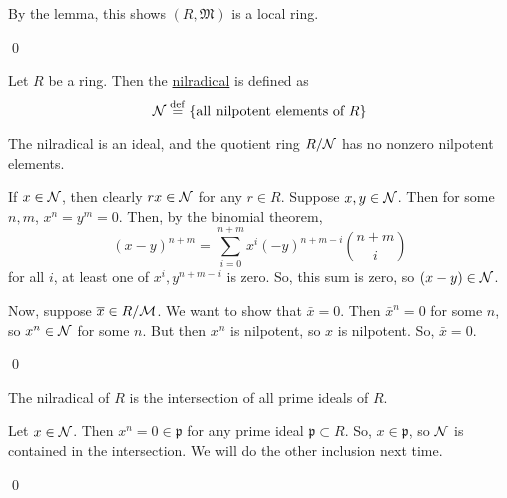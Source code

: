 \documentclass[x11names,reqno,14pt]{extarticle}
\newcommand{\mk}[1]{\mathfrak{#1}}
\begin{document}
By the lemma, this shows $(R, \mk{M})$ is a local ring. 

\qed


Let $R$ be a ring. Then the \underline{nilradical} is defined as
\[
\mathcal{N}\overset{\mathrm{def}}{=}\{\text{all nilpotent elements of }R\}
\]

\prop

The nilradical is an ideal, and the quotient ring $R/\mathcal{N}$ has no nonzero nilpotent elements. 

\proof

If $x \in \mathcal{N}$, then clearly $rx \in \mathcal{N}$ for any $r \in R$. Suppose $x, y \in \mathcal{N}$. Then for some $n, m$, $x^n = y^m = 0$. Then, by the binomial theorem, 
\[
(x - y)^{n + m} = \sum_{i=0}^{n + m}x^i(-y)^{n + m - i}{n + m\choose i}
\]
for all $i$, at least one of $x^i, y^{n + m - i}$ is zero. So, this sum is zero, so $(x - y) \in \mathcal{N}$. 

Now, suppose $\overline{x}\in R/\mathcal{M}$. We want to show that $\bar{x} = 0$. Then $\bar{x}^n = 0$ for some $n$, so $x^n \in \mathcal{N}$ for some $n$. But then $x^n$ is nilpotent, so $x$ is nilpotent. So, $\bar{x} = 0$. 

\qed

\prop

The nilradical of $R$ is the intersection of all prime ideals of $R$. 

\proof

Let $x \in \mathcal{N}$. Then $x^n = 0 \in \mk{p}$ for any prime ideal $\mk{p} \subset R$. So, $x \in \mk{p}$, so $\mathcal{N}$ is contained in the intersection. We will do the other inclusion next time. 

\qed
\end{document}
